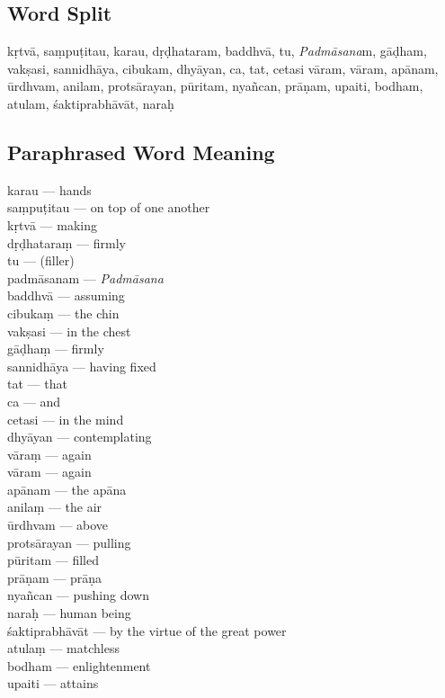 \subsection*{Word Split}

kṛtvā, saṃpuṭitau, karau,  dṛḍhataram, baddhvā, tu, \textit{Padmāsana}m, gāḍham, vakṣasi, sannidhāya, cibukam, dhyāyan, ca, tat, cetasi vāram, vāram,  apānam, ūrdhvam, anilam, protsārayan, pūritam, nyañcan, prāṇam, upaiti, bodham, atulam,  śaktiprabhāvāt, naraḥ

\subsection*{Paraphrased Word Meaning}

\begin{multicols}{2}
karau  ---  hands \\
saṃpuṭitau ---  on top of one another \\
kṛtvā ---  making \\
dṛḍhataraṃ ---  firmly \\
tu ---  (filler)  \\
padmāsanam ---  \textit{Padmāsana} \\
baddhvā ---  assuming  \\
cibukaṃ ---  the chin  \\
vakṣasi ---  in the chest \\ 
gāḍhaṃ ---  firmly  \\
sannidhāya ---  having fixed  \\
tat --- that  \\
ca ---   and  \\
cetasi --- in the mind   \\
dhyāyan ---  contemplating \\  
vāraṃ ---  again  \\
vāram ---  again  \\
apānam ---  the apāna \\
anilaṃ ---  the air  \\
ūrdhvam ---  above  \\
protsārayan ---  pulling  \\
pūritam ---  filled  \\
prāṇam ---  prāṇa \\
nyañcan ---  pushing down  \\
naraḥ --- human being  \\
śaktiprabhāvāt ---  by the virtue of the great power  \\
atulaṃ ---  matchless  \\
bodham ---  enlightenment  \\
upaiti ---  attains
\end{multicols}

